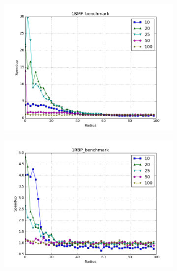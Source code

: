 \documentclass[review,preprint,12pt]{elsarticle}
\theoremstyle{definition}
\theoremstyle{remark}
\numberwithin{equation}{section}
\begin{document}
\begin{figure}[tbp]
\begin{subfigure}[b]{0.49\textwidth}
        \includegraphics[width=1\textwidth]{assets/1BMF_benchmark_euclid}
        \caption{}
    \end{subfigure}%
    \begin{subfigure}[b]{0.49\textwidth}
        \includegraphics[width=1\textwidth]{assets/1RBP_benchmark_euclid}
        \caption{}
    \end{subfigure}
    \begin{subfigure}[b]{0.49\textwidth}

\end{subfigure}
\end{figure}
\end{document}
